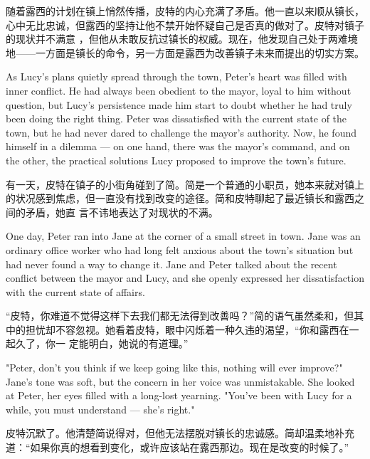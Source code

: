 随着露西的计划在镇上悄然传播，皮特的内心充满了矛盾。他一直以来顺从镇长，心中无比忠诚，但露西的坚持让他不禁开始怀疑自己是否真的做对了。皮特对镇子的现状并不满意
，但他从未敢反抗过镇长的权威。现在，他发现自己处于两难境地——一方面是镇长的命令，另一方面是露西为改善镇子未来而提出的切实方案。

\begin{flushright}
    As Lucy's plans quietly spread through the town, Peter's heart was filled with
    inner conflict. He had always been obedient to the mayor, loyal to him without
    question, but Lucy's persistence made him start to doubt whether he had truly
    been doing the right thing. Peter was dissatisfied with the current state of
    the town, but he had never dared to challenge the mayor's authority. Now, he
    found himself in a dilemma — on one hand, there was the mayor's command, and on
    the other, the practical solutions Lucy proposed to improve the town's future.
\end{flushright}

有一天，皮特在镇子的小街角碰到了简。简是一个普通的小职员，她本来就对镇上的状况感到焦虑，但一直没有找到改变的途径。简和皮特聊起了最近镇长和露西之间的矛盾，她直
言不讳地表达了对现状的不满。

\begin{flushright}
    One day, Peter ran into Jane at the corner of a small street in town. Jane was
    an ordinary office worker who had long felt anxious about the town's situation
    but had never found a way to change it. Jane and Peter talked about the recent
    conflict between the mayor and Lucy, and she openly expressed her
    dissatisfaction with the current state of affairs.
\end{flushright}

“皮特，你难道不觉得这样下去我们都无法得到改善吗？”简的语气虽然柔和，但其中的担忧却不容忽视。她看着皮特，眼中闪烁着一种久违的渴望，“你和露西在一起久了，你一
定能明白，她说的有道理。”

\begin{flushright}
    "Peter, don't you think if we keep going like this, nothing will ever improve?"
    Jane’s tone was soft, but the concern in her voice was unmistakable. She looked
    at Peter, her eyes filled with a long-lost yearning. "You've been with Lucy for
    a while, you must understand — she’s right."
\end{flushright}

皮特沉默了。他清楚简说得对，但他无法摆脱对镇长的忠诚感。简却温柔地补充道：“如果你真的想看到变化，或许应该站在露西那边。现在是改变的时候了。”

